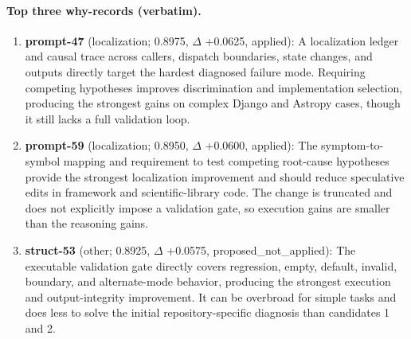 \paragraph{Top three why-records (verbatim).}\begin{enumerate}\itemsep1pt
\item \textbf{prompt-47} (localization; 0.8975, $\Delta$ +0.0625, applied): A localization ledger and causal trace across callers, dispatch boundaries, state changes, and outputs directly target the hardest diagnosed failure mode. Requiring competing hypotheses improves discrimination and implementation selection, producing the strongest gains on complex Django and Astropy cases, though it still lacks a full validation loop.
\item \textbf{prompt-59} (localization; 0.8950, $\Delta$ +0.0600, applied): The symptom-to-symbol mapping and requirement to test competing root-cause hypotheses provide the strongest localization improvement and should reduce speculative edits in framework and scientific-library code. The change is truncated and does not explicitly impose a validation gate, so execution gains are smaller than the reasoning gains.
\item \textbf{struct-53} (other; 0.8925, $\Delta$ +0.0575, proposed\_not\_applied): The executable validation gate directly covers regression, empty, default, invalid, boundary, and alternate-mode behavior, producing the strongest execution and output-integrity improvement. It can be overbroad for simple tasks and does less to solve the initial repository-specific diagnosis than candidates 1 and 2.
\end{enumerate}
